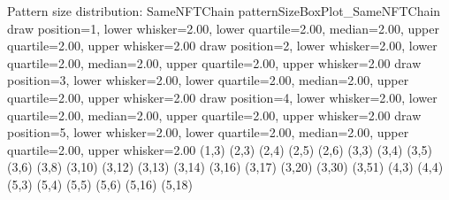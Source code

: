 \sizeBoxPlot
{Pattern size distribution: SameNFTChain}
{patternSizeBoxPlot_SameNFTChain}
{draw position=1, lower whisker=2.00, lower quartile=2.00, median=2.00, upper quartile=2.00, upper whisker=2.00}
{draw position=2, lower whisker=2.00, lower quartile=2.00, median=2.00, upper quartile=2.00, upper whisker=2.00}
{draw position=3, lower whisker=2.00, lower quartile=2.00, median=2.00, upper quartile=2.00, upper whisker=2.00}
{draw position=4, lower whisker=2.00, lower quartile=2.00, median=2.00, upper quartile=2.00, upper whisker=2.00}
{draw position=5, lower whisker=2.00, lower quartile=2.00, median=2.00, upper quartile=2.00, upper whisker=2.00}
{(1,3) (2,3) (2,4) (2,5) (2,6) (3,3) (3,4) (3,5) (3,6) (3,8) (3,10) (3,12) (3,13) (3,14) (3,16) (3,17) (3,20) (3,30) (3,51) (4,3) (4,4) (5,3) (5,4) (5,5) (5,6) (5,16) (5,18) }
